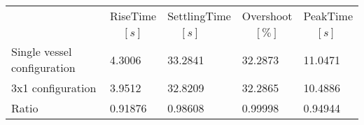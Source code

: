 \begin{tabular}{lllll}
  & RiseTime & SettlingTime & Overshoot & PeakTime \\ 
 & $\;\;\;\;[s]$ & $\;\;\;\;[s]$ & $\;\;\;\;[\%]$ & $\;\;\;\;[s]$ \\ 
\hline 
Single vessel configuration & 4.3006 & 33.2841 & 32.2873 & 11.0471 \\ 
3x1 configuration & 3.9512 & 32.8209 & 32.2865 & 10.4886 \\[10pt] \hline
Ratio & 0.91876 & 0.98608 & 0.99998 & 0.94944 \\ 
\end{tabular}